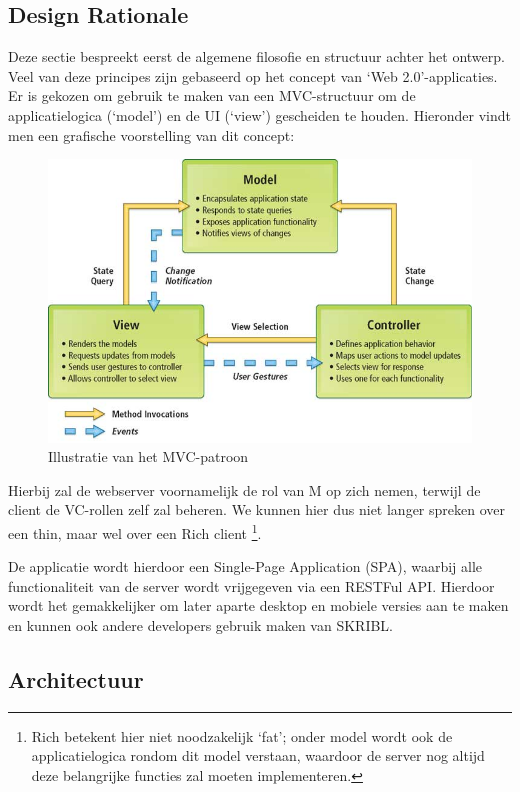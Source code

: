 \documentclass{article}
\begin{document}
\subsection{Design Rationale}
\label{sec:rationale}

Deze sectie bespreekt eerst de algemene filosofie en structuur achter het ontwerp. Veel van deze principes zijn gebaseerd op het concept van `Web 2.0'-applicaties.
Er is gekozen om gebruik te maken van een MVC-structuur om de applicatielogica (`model') en de UI (`view') gescheiden te houden. 
Hieronder vindt men een grafische voorstelling van dit concept:

\begin{figure}[!h]
\centering
 \includegraphics[width=130mm]{MVC.jpg}
 \caption{Illustratie van het MVC-patroon}
 \label{Model-View-Controller}
\end{figure}

\thispagestyle{fancy}
Hierbij zal de webserver voornamelijk de rol van M op zich nemen, terwijl de client de VC-rollen zelf zal beheren. We kunnen hier dus niet langer spreken over een thin, maar wel over een Rich client \footnote{Rich betekent hier niet noodzakelijk `fat'; onder model wordt ook de applicatielogica rondom dit model verstaan, waardoor de server nog altijd deze belangrijke functies zal moeten implementeren.}. 

De applicatie wordt hierdoor een Single-Page Application (SPA), waarbij alle functionaliteit van de server wordt vrijgegeven via een RESTFul API. Hierdoor wordt het gemakkelijker om later aparte desktop en mobiele versies aan te maken en kunnen ook andere developers gebruik maken van SKRIBL.

\subsection{Architectuur}
\end{document}
